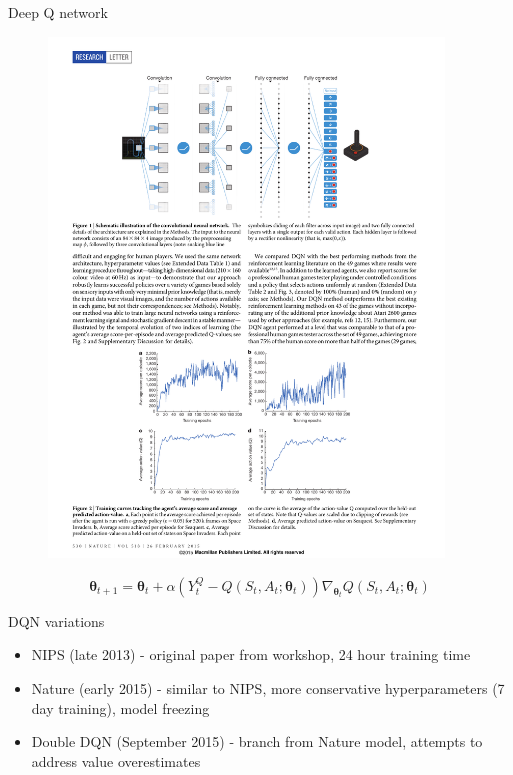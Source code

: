 \documentclass{beamer}
\begin{document}
\begin{frame}{Deep Q network}
  \begin{figure}[H]
    \centering
    \includegraphics[width=105mm]{deep_q_network.pdf}
  \end{figure}
  \[ \boldsymbol{\theta}_{t+1} = \boldsymbol{\theta}_t+\alpha(Y_t^Q-Q(S_t,A_t;\boldsymbol{\theta}_t))\nabla_{\boldsymbol{\theta}_t}Q(S_t,A_t;\boldsymbol{\theta}_t) \]
\end{frame}

\begin{frame}{DQN variations}
  \begin{itemize}
  \item {
      NIPS (late 2013) - original paper from workshop, 24 hour training time
  }
  \item {
      Nature (early 2015) - similar to NIPS, more conservative hyperparameters (7 day training), model freezing
  }
  \item {
      Double DQN (September 2015) - branch from Nature model, attempts to address value overestimates
  }
  \end{itemize}
\end{frame}
\end{document}

